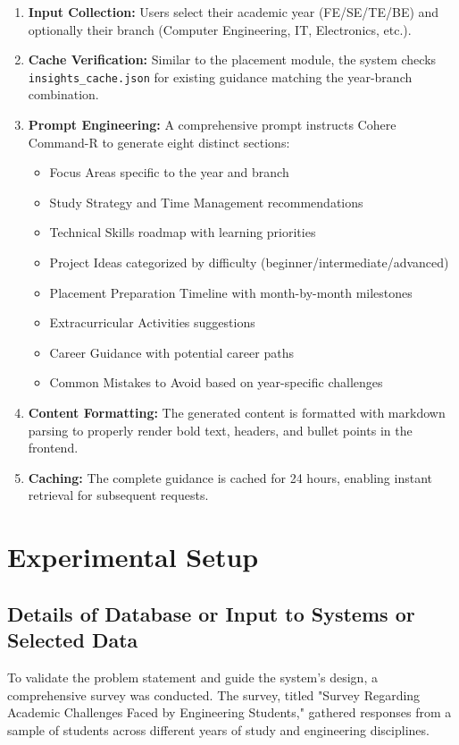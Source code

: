 \documentclass[12pt]{article}
\begin{document}
\begin{enumerate}
    \item \textbf{Input Collection:} Users select their academic year (FE/SE/TE/BE) and optionally their branch (Computer Engineering, IT, Electronics, etc.).
    
    \item \textbf{Cache Verification:} Similar to the placement module, the system checks \texttt{insights\_cache.json} for existing guidance matching the year-branch combination.
    
    \item \textbf{Prompt Engineering:} A comprehensive prompt instructs Cohere Command-R to generate eight distinct sections:
    \begin{itemize}
        \item Focus Areas specific to the year and branch
        \item Study Strategy and Time Management recommendations
        \item Technical Skills roadmap with learning priorities
        \item Project Ideas categorized by difficulty (beginner/intermediate/advanced)
        \item Placement Preparation Timeline with month-by-month milestones
        \item Extracurricular Activities suggestions
        \item Career Guidance with potential career paths
        \item Common Mistakes to Avoid based on year-specific challenges
    \end{itemize}
    
    \item \textbf{Content Formatting:} The generated content is formatted with markdown parsing to properly render bold text, headers, and bullet points in the frontend.
    
    \item \textbf{Caching:} The complete guidance is cached for 24 hours, enabling instant retrieval for subsequent requests.
\end{enumerate}

\section{Experimental Setup}
\subsection{Details of Database or Input to Systems or Selected Data}
To validate the problem statement and guide the system's design, a comprehensive survey was conducted. The survey, titled "Survey Regarding Academic Challenges Faced by Engineering Students," gathered responses from a sample of students across different years of study and engineering disciplines.
\end{document}
